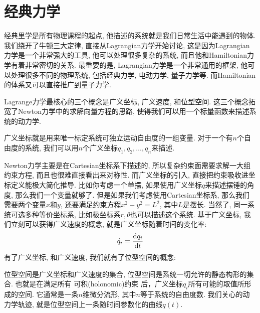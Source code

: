 \newpage
\section{经典力学}
\label{CH1 S4 Classical mechanics}
经典里学是所有物理课程的起点, 他描述的系统就是我们日常生活中能遇到的物体.
我们绕开了牛顿三大定律, 直接从Lagrangian力学开始讨论, 这是因为Lagrangian力学是一个非常强大的工具, 他可以处理很多复杂的系统, 而且他和Hamiltonian力学有着非常密切的关系.
最重要的是, Lagrangian力学是一个非常通用的框架, 他可以处理很多不同的物理系统, 包括经典力学, 电动力学, 量子力学等.
而Hamiltonian的体系又可以直接推广到量子力学.


Lagrange力学最核心的三个概念是广义坐标, 广义速度, 和位型空间.
这三个概念拓宽了Newton力学中的求解向量方程的思路, 使得我们可以用一个标量函数来描述系统的动力学.
\begin{definition}[][广义坐标]
  广义坐标就是用来唯一标定系统可独立运动自由度的一组变量.
  对于一个有$n$个自由度的系统, 我们可以用$n$个广义坐标$q_1, q_2, \ldots, q_n$来描述.
\end{definition}
Newton力学主要是在Cartesian坐标系下描述的, 所以复杂约束面需要求解一大组约束方程, 而且也很难直接看出来对称性.
而广义坐标的引入, 直接把约束吸收进坐标定义能极大简化推导.
比如你考虑一个单摆, 如果使用广义坐标$q$来描述摆锤的角度, 那么我们一个变量就够了.
但是如果我们考虑使用Cartesian坐标系, 那么我们需要两个变量$x$和$y$, 还要满足约束方程$x^2 + y^2 = L^2$, 其中$L$是摆长.
当然了, 同一系统可选多种等价坐标系, 比如极坐标系$r, \theta$也可以描述这个系统.
基于广义坐标, 我们立刻可以获得广义速度的概念, 就是广义坐标随着时间的变化率:
\begin{equation}
  \dot{q}_i = \dv{q_i}{t}
\end{equation}
有了广义坐标, 和广义速度, 我们就有了位型空间的概念:
\begin{definition}
  位型空间是广义坐标和广义速度的集合, 位型空间是系统一切允许的静态构形的集合.
  也就是在满足所有 可积(holonomic)约束 后，广义坐标$q_i$所有可能的取值所形成的空间.
  它通常是一条$n$维微分流形, 其中$n$等于系统的自由度数.
  我们关心的动力学轨迹, 就是位型空间上一条随时间参数化的曲线$q(t)$.
\end{definition}








